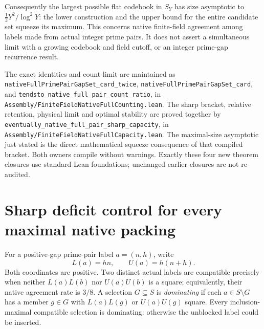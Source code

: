 \documentclass[11pt]{article}
\begin{document}
Consequently the largest possible flat codebook in \(S_Y\) has size
asymptotic to \(\tfrac12Y^2/\log^2Y\): the lower construction and the
upper bound for the entire candidate set squeeze its maximum.
This concerns native finite-field agreement among labels made from
actual integer prime pairs. It does not assert a simultaneous limit
with a growing codebook and field cutoff, or an integer prime-gap
recurrence result.

The exact identities and count limit are maintained as
\texttt{nativeFullPrimePairGapSet\_card\_twice},
\texttt{nativeFullPrimePairGapSet\_card}, and
\texttt{tendsto\_native\_full\_pair\_count\_ratio}, in
\texttt{Assembly/\allowbreak FiniteFieldNativeFullCounting.\allowbreak lean}.
The sharp bracket, relative retention, physical limit and optimal
stability are proved together by
\texttt{eventually\_native\_full\_pair\_sharp\_capacity}, in
\texttt{Assembly/\allowbreak FiniteFieldNativeFullCapacity.\allowbreak lean}.
The maximal-size asymptotic just stated is the direct mathematical
squeeze consequence of that compiled bracket.
Both owners compile without warnings. Exactly these four new theorem
closures use standard Lean foundations; unchanged earlier closures
are not re-audited.

\section{Sharp deficit control for every maximal native packing}
\label{sec:native-maximal-deficit}
For a positive-gap prime-pair label \(a=(n,h)\), write
\[
 L(a)=hn,\qquad U(a)=h(n+h).
\]
Both coordinates are positive. Two distinct actual labels are compatible
precisely when neither \(L(a)L(b)\) nor \(U(a)U(b)\) is a square; equivalently,
their native agreement rate is \(3/8\). A selection \(G\subseteq S\) is
\emph{dominating} if each \(a\in S\setminus G\) has a member \(g\in G\)
with \(L(a)L(g)\) or \(U(a)U(g)\) square. Every inclusion-maximal compatible
selection is dominating: otherwise the unblocked label could be inserted.
\end{document}
